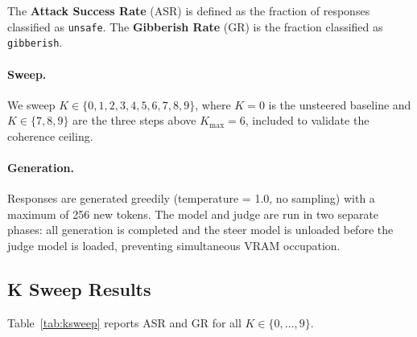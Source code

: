 \documentclass[10pt]{article}
\begin{document}
The \textbf{Attack Success Rate} (ASR) is defined as the fraction of
responses classified as \texttt{unsafe}.  The \textbf{Gibberish Rate} (GR)
is the fraction classified as \texttt{gibberish}.

\paragraph{Sweep.}
We sweep $K \in \{0, 1, 2, 3, 4, 5, 6, 7, 8, 9\}$, where $K=0$ is the
unsteered baseline and $K \in \{7, 8, 9\}$ are the three steps above
$K_\text{max} = 6$, included to validate the coherence ceiling.

\paragraph{Generation.}
Responses are generated greedily (temperature = 1.0, no sampling) with a
maximum of 256 new tokens.  The model and judge are run in two separate
phases: all generation is completed and the steer model is unloaded before
the judge model is loaded, preventing simultaneous VRAM occupation.

\subsection{K Sweep Results}
\label{sec:experiments:ksweep}

Table~\ref{tab:ksweep} reports ASR and GR for all $K \in \{0,\ldots,9\}$.
\end{document}
